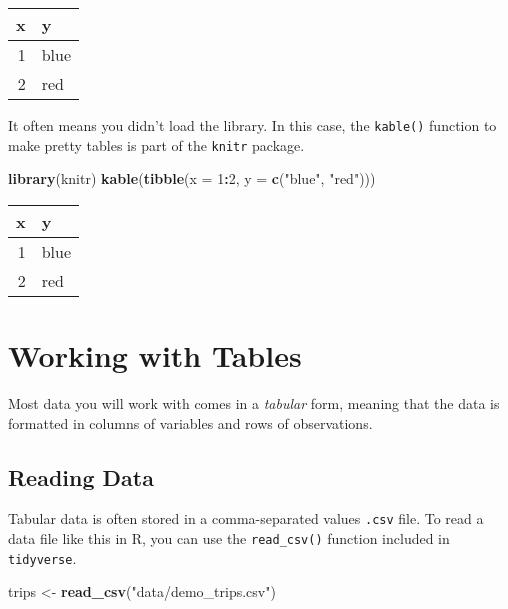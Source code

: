 \documentclass[]{book}
\newenvironment{Shaded}{\begin{snugshade}}{\end{snugshade}}
\newcommand{\DataTypeTok}[1]{\textcolor[rgb]{0.13,0.29,0.53}{#1}}
\newcommand{\DecValTok}[1]{\textcolor[rgb]{0.00,0.00,0.81}{#1}}
\newcommand{\KeywordTok}[1]{\textcolor[rgb]{0.13,0.29,0.53}{\textbf{#1}}}
\newcommand{\NormalTok}[1]{#1}
\newcommand{\OperatorTok}[1]{\textcolor[rgb]{0.81,0.36,0.00}{\textbf{#1}}}
\newcommand{\StringTok}[1]{\textcolor[rgb]{0.31,0.60,0.02}{#1}}
\begin{document}
\begin{tabular}{r|l}
\hline
x & y\\
\hline
1 & blue\\
\hline
2 & red\\
\hline
\end{tabular}

It often means you didn't load the library. In this case, the \texttt{kable()} function
to make pretty tables is part of the \texttt{knitr} package.

\begin{Shaded}
\begin{Highlighting}[]
\KeywordTok{library}\NormalTok{(knitr)}
\KeywordTok{kable}\NormalTok{(}\KeywordTok{tibble}\NormalTok{(}\DataTypeTok{x =} \DecValTok{1}\OperatorTok{:}\DecValTok{2}\NormalTok{, }\DataTypeTok{y =} \KeywordTok{c}\NormalTok{(}\StringTok{"blue"}\NormalTok{, }\StringTok{"red"}\NormalTok{)))}
\end{Highlighting}
\end{Shaded}

\begin{tabular}{r|l}
\hline
x & y\\
\hline
1 & blue\\
\hline
2 & red\\
\hline
\end{tabular}

\hypertarget{working-with-tables}{%
\section{Working with Tables}\label{working-with-tables}}

Most data you will work with comes in a \emph{tabular} form, meaning that the data
is formatted in columns of variables and rows of observations.

\hypertarget{reading-data}{%
\subsection{Reading Data}\label{reading-data}}

Tabular data is often stored in a comma-separated values \texttt{.csv} file. To read a
data file like this in R, you can use the \texttt{read\_csv()} function included in
\texttt{tidyverse}.

\begin{Shaded}
\begin{Highlighting}[]
\NormalTok{trips <-}\StringTok{ }\KeywordTok{read_csv}\NormalTok{(}\StringTok{"data/demo_trips.csv"}\NormalTok{)}
\end{Highlighting}
\end{Shaded}
\end{document}
